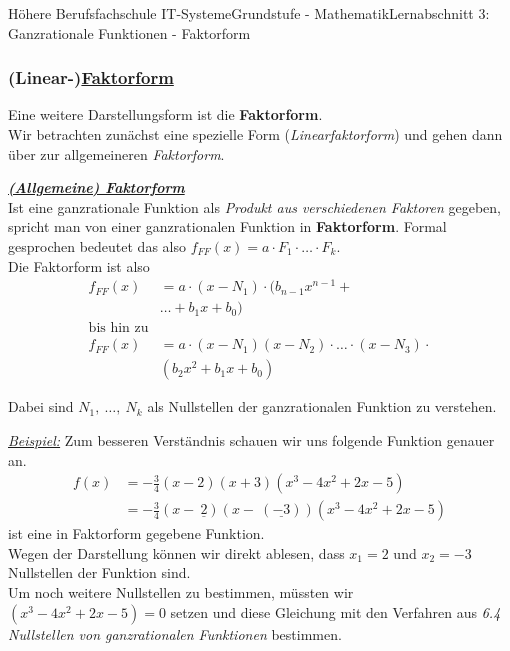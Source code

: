 \documentclass[11pt,twocolumn,oneside,openany,headings=optiontotoc,11pt,numbers=noenddot]{article}
\begin{document}
\begin{worksheet}{Höhere Berufsfachschule IT-Systeme}{Grundstufe - Mathematik}{Lernabschnitt 3: Ganzrationale Funktionen - Faktorform}
		\subsubsection{(Linear-)\underline{Faktorform}}
		Eine weitere Darstellungsform ist die \textbf{Faktorform}.\\
		Wir betrachten zunächst eine spezielle Form (\textit{Linearfaktorform}) und gehen dann über zur allgemeineren \textit{Faktorform}.\\
		\par
		\underline{\textbf{\textit{(Allgemeine) Faktorform}}}\\
		Ist eine ganzrationale Funktion als \textit{Produkt aus verschiedenen Faktoren} gegeben, spricht man von einer ganzrationalen Funktion in \textbf{Faktorform}. Formal gesprochen bedeutet das also \(f_{FF}(x) = a\cdot{}F_1\cdot\ldots\cdot{}F_k\).\\
		Die Faktorform ist also 
		\begin{align*}
			f_{FF}(x) & = a\cdot{}(x-N_1)\cdot{}(b_{n-1}x^{n-1}+\\
			&\ldots{}+b_1x+ b_0)\\
			\text{bis hin zu}\\
			f_{FF}(x) & = a\cdot{}(x-N_1)(x-N_2)\cdot{}\ldots{}\cdot{}(x-N_3)\cdot\\
			&(b_{2}x^2 + b_1x + b_0)
		\end{align*}
		\par\noindent
		Dabei sind \(N_1,\ \ldots,\ N_k\) als Nullstellen der ganzrationalen Funktion zu verstehen.\\
		\par\noindent
		\underline{\textit{Beispiel:}} Zum besseren Verständnis schauen wir uns folgende Funktion genauer an.\\
		\begin{align*}
			f(x) & = -\frac{3}{4}(x-2)(x+3)(x^3 - 4x^2 + 2x -5)\\
			& = -\frac{3}{4}(x-\ \underline{2})(x-\ (\underline{-3}))(x^3-4x^2+2x-5)
		\end{align*}
		ist eine in Faktorform gegebene Funktion.\\
		Wegen der Darstellung können wir direkt ablesen, dass \colorbox{green!10}{\(x_1 = 2\)} und \colorbox{green!10}{\(x_2 = -3\)} Nullstellen der Funktion sind.\\
		Um noch weitere Nullstellen zu bestimmen, müssten wir \((x^3-4x^2 + 2x -5 ) = 0\) setzen und diese Gleichung mit den Verfahren aus \textit{6.4 Nullstellen von ganzrationalen Funktionen} bestimmen.
		\begin{framed}

\end{framed}
\end{worksheet}
\end{document}
